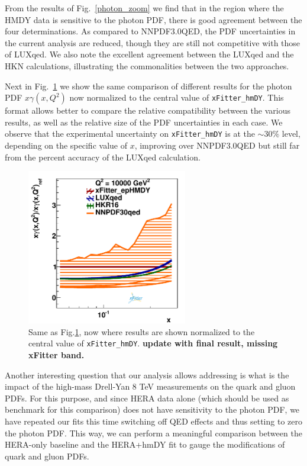 From the results of Fig.~\ref{photon_zoom} we find that in the region where the HMDY data is
sensitive to the photon PDF, there is good agreement between the four determinations.
%
As compared to NNPDF3.0QED, the PDF uncertainties in the current analysis are reduced, though
they are still not competitive with those of LUXqed.
%
We also note the excellent agreement between the LUXqed and the HKN calculations,
illustrating the commonalities between the two approaches.

Next in Fig.~\ref{photon_zoom_ratio} we show the same comparison of different
results for the photon PDF $x\gamma(x,Q^2)$ now normalized to the central value of {\tt xFitter\_hmDY}.
%
This format allows better to compare the relative compatibility between the various results,
as well as the relative size of the PDF uncertainties in each case.
%
We observe that the experimental uncertainty on {\tt xFitter\_hmDY} is at the $\sim 30\%$ level,
depending on the specific value of $x$, improving over NNPDF3.0QED but still far from the
percent accuracy of the LUXqed calculation.

\begin{figure}[h]
\includegraphics[width=7cm]{figs/photon_comp_10000_ratio.pdf} 
\caption{Same as Fig.\ref{photon_zoom_ratio}, now where results
  are shown normalized to the central value of {\tt xFitter\_hmDY}.
  {\bf update with final result, missing xFitter band.}
  }
\label{photon_zoom_ratio}
\end{figure}

Another interesting question that our analysis allows addressing is what is
the impact of the high-mass Drell-Yan 8 TeV measurements on the quark and gluon
PDFs.
%
For this purpose, and since HERA data alone (which should be used as benchmark for
this comparison) does not have sensitivity to the photon PDF,
we have repeated our fits this time switching off QED effects and thus setting to zero
the photon PDF.
%
This way, we can perform a meaningful comparison between the HERA-only baseline and the
HERA+hmDY fit to gauge the modifications of quark and gluon PDFs.

